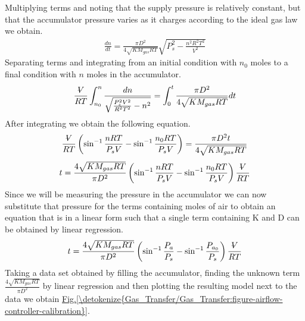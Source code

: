 \documentclass[letterpaper,10pt,english]{sphinxmanual}
\begin{document}
Multiplying terms and noting that the supply pressure is relatively constant, but that the accumulator pressure varies as it charges according to the ideal gas law we obtain.
\begin{equation}\label{equation:Gas_Transfer/Gas_Transfer:Gas_Transfer/Gas_Transfer:13}
\begin{split}\frac{dn}{dt} =\frac{\pi D^{2} }{4\sqrt{KM_{gas} RT} } \sqrt{P_{s}^{2} -\frac{n^{2} R^{2} T^{2} }{V^{2} } }\end{split}
\end{equation}
Separating terms and integrating from an initial condition with \(n_0\) moles to a final condition with \(n\) moles in the accumulator.
\begin{equation}\label{equation:Gas_Transfer/Gas_Transfer:Gas_Transfer/Gas_Transfer:14}
\begin{split}\frac{\rlap{--}V}{RT} \int _{n_{0} }^{n }\frac{dn}{\sqrt{\frac{P_{s}^{2} V^{2} }{R^{2} T^{2} } -n^{2} } }  =\int _{0}^{t}\frac{\pi D^{2} }{4\sqrt{KM_{gas} RT} } dt\end{split}
\end{equation}
After integrating we obtain the following equation.
\begin{equation}\label{equation:Gas_Transfer/Gas_Transfer:Gas_Transfer/Gas_Transfer:15}
\begin{split}\frac{\rlap{--}V}{RT} \left(\sin ^{-1} \frac{n RT}{P_{s} V} -\sin ^{-1} \frac{n_{0} RT}{P_{s} V} \right)=\frac{\pi D^{2} t}{4\sqrt{KM_{gas} RT} }\end{split}
\end{equation}\begin{equation}\label{equation:Gas_Transfer/Gas_Transfer:Gas_Transfer/Gas_Transfer:16}
\begin{split}t=\frac{4\sqrt{KM_{gas} RT} }{\pi D^{2} } \left(\sin ^{-1} \frac{n RT}{P_{s} V} -\sin ^{-1} \frac{n_{0} RT}{P_{s} V} \right)\frac{\rlap{--}V}{RT}\end{split}
\end{equation}
Since we will be measuring the pressure in the accumulator we can now substitute that pressure for the terms containing moles of air to obtain an equation that is in a linear form such that a single term containing K and D can be obtained by linear regression.
\begin{equation}\label{equation:Gas_Transfer/Gas_Transfer:eq_t_fill_accumulator}
\begin{split} t=\frac{4\sqrt{KM_{gas} RT} }{\pi D^{2} } \left(\sin ^{-1} \frac{P_{a } }{P_{s} } -\sin ^{-1} \frac{P_{a_{0} } }{P_{s} } \right)\frac{\rlap{--}V}{RT}\end{split}
\end{equation}
Taking a data set obtained by filling the accumulator, finding the unknown term \(\frac{4\sqrt{KM_{gas} RT} }{\pi D^{2} }\) by linear regression and then plotting the resulting model next to the data we obtain \hyperref[\detokenize{Gas_Transfer/Gas_Transfer:figure-airflow-controller-calibration}]{Fig.\@ \ref{\detokenize{Gas_Transfer/Gas_Transfer:figure-airflow-controller-calibration}}}.
\end{document}
